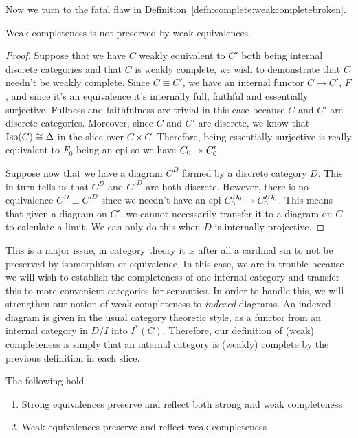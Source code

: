 Now we turn to the fatal flaw in
Definition~\ref{defn:complete:weakcompletebroken}.
\begin{thm}\label{thm:complete:weakcompletenotpreserved}
  Weak completeness is not preserved by weak equivalences.
\end{thm}
\begin{proof}
  Suppose that we have $C$ weakly equivalent to $C'$ both being
  internal discrete categories and that $C$ is weakly complete, we
  wish to demonstrate that $C$ needn't be weakly complete. Since
  $C \equiv C'$, we have an internal functor $C \to C'$, $F$, and
  since it's an equivalence it's internally full, faithful and
  essentially surjective. Fullness and faithfulness are trivial in
  this case because $C$ and $C'$ are discrete categories. Moreover,
  since $C$ and $C'$ are discrete, we know that
  $\operatorname{Iso}(C) \cong \Delta$ in the slice over $C \times C$. Therefore,
  being essentially surjective is really equivalent to $F_0$ being an
  epi so we have $C_0 \twoheadrightarrow C'_0$.

  Suppose now that we have a diagram $C^D$ formed by a discrete
  category $D$. This in turn tells us that $C^D$ and $C'^D$ are both
  discrete. However, there is no equivalence $C^D \equiv C'^D$ since
  we needn't have an epi $C_0^{D_0} \twoheadrightarrow C_0'^{D_0}$. This means that
  given a diagram on $C'$, we cannot necessarily transfer it to a
  diagram on $C$ to calculate a limit. We can only do this when $D$ is
  internally projective.
\end{proof}
This is a major issue, in category theory it is after all a cardinal
sin to not be preserved by isomorphism or equivalence. In this case,
we are in trouble because we will wish to establish the completeness
of one internal category and transfer this to more convenient
categories for semantics. In order to handle this, we will strengthen
our notion of weak completeness to \emph{indexed} diagrams. An indexed
diagram is given in the usual category theoretic style, as a functor
from an internal category in $D/I$ into $I^*(C)$. Therefore, our
definition of (weak) completeness is simply that an internal category
is (weakly) complete by the previous definition in each slice.
\begin{thm}\label{thm:complete:preservation}
  The following hold
  \begin{enumerate}
  \item Strong equivalences preserve and reflect both strong and weak
    completeness
  \item Weak equivalences preserve and reflect weak completeness
  \end{enumerate}
\end{thm}
